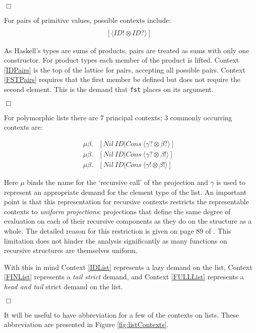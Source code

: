 \hfill$\Box$

For pairs of primitive values, possible contexts include:
\begin{align}
[\langle ID? \otimes ID? \rangle] \label{IDPairs} \\
[\langle ID! \otimes ID? \rangle] \label{FSTPairs}
\end{align}


As Haskell's types are sums of products, pairs are treated as sums with only
one constructor.  For product types each member of the product is lifted.
Context \ref{IDPairs} is the top of the lattice for pairs, accepting all
possible pairs. Context \ref{FSTPairs} requires that the first member be
defined but does not require the second element. This is the demand that
\verb-fst- places on its argument.

\hfill$\Box$

For polymorphic lists there are 7 principal contexts; 3 commonly occurring contexts are:

\begin{align}
    \mu\beta.&[Nil\ ID | Cons\ \langle \gamma? \otimes \beta?\rangle] \label{IDList} \\
    \mu\beta.&[Nil\ ID | Cons\ \langle \gamma? \otimes \beta!\rangle] \label{FINList} \\
    \mu\beta.&[Nil\ ID | Cons\ \langle \gamma! \otimes \beta!\rangle] \label{FULLList}
\end{align}


Here $\mu$ binds the name for the `recursive call' of the projection and
$\gamma$ is used to represent an appropriate demand for the element type of the
list.  An important point is that this representation for recursive contexts
restricts the representable contexts to \emph{uniform projections}: projections
that define the same degree of evaluation on each of their recursive components
as they do on the structure as a whole. The detailed reason for this
restriction is given on page 89 of \cite{hinze1995projection}. This limitation
does not hinder the analysis significantly as many functions on recursive
structures are themselves uniform.

With this in mind Context \ref{IDList} represents a lazy demand on the list,
Context \ref{FINList} represents a \emph{tail strict} demand, and Context
\ref{FULLList} represents a \emph{head and tail} strict demand on the list.

\hfill$\Box$

It will be useful to have abbreviation for a few of the contexts on lists. These
abbreviation are presented in Figure \ref{fig:listContexts}.

